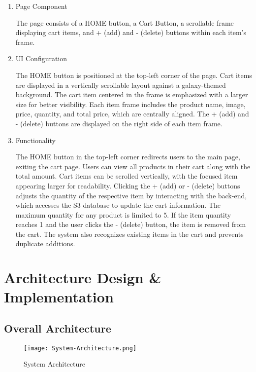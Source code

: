 \documentclass[conference]{IEEEtran}
\begin{document}
\begin{enumerate}
\item Page Component

The page consists of a HOME button, a Cart Button, a scrollable frame displaying cart items, and + (add) and - (delete) buttons within each item's frame.

\item UI Configuration

The HOME button is positioned at the top-left corner of the page. Cart items are displayed in a vertically scrollable layout against a galaxy-themed background. The cart item centered in the frame is emphasized with a larger size for better visibility. Each item frame includes the product name, image, price, quantity, and total price, which are centrally aligned. The + (add) and - (delete) buttons are displayed on the right side of each item frame.

\item Functionality

The HOME button in the top-left corner redirects users to the main page, exiting the cart page. Users can view all products in their cart along with the total amount. Cart items can be scrolled vertically, with the focused item appearing larger for readability. Clicking the + (add) or - (delete) buttons adjusts the quantity of the respective item by interacting with the back-end, which accesses the S3 database to update the cart information. The maximum quantity for any product is limited to 5. If the item quantity reaches 1 and the user clicks the - (delete) button, the item is removed from the cart. The system also recognizes existing items in the cart and prevents duplicate additions.

\end{enumerate}



\section{Architecture Design \& Implementation}
\vspace{0.5cm}
\subsection{Overall Architecture}

\begin{figure}[H]
    \centering
    \texttt{[image: System-Architecture.png]}
    \caption{System Architecture}
    \label{fig:system-architecture}
\end{figure}
\end{document}
